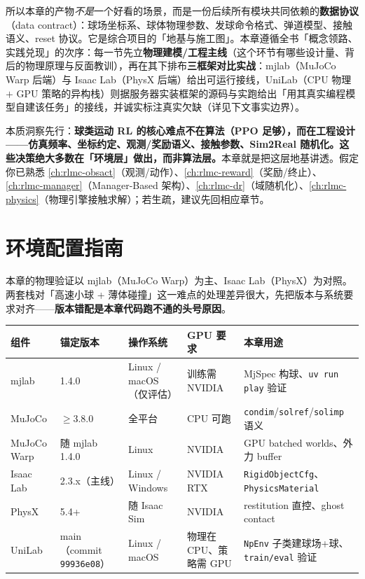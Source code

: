 所以本章的产物\emph{不是}一个好看的场景，而是一份后续所有模块共同依赖的\textbf{数据协议}（data contract）：球场坐标系、球体物理参数、发球命令格式、弹道模型、接触语义、reset 协议。它是综合项目的「地基与施工图」。本章遵循全书「概念领路、实践兑现」的次序：每一节先立\textbf{物理建模/工程主线}（这个环节有哪些设计量、背后的物理原理与反面教训），再在其下排布\textbf{三框架对比实战}：mjlab（MuJoCo Warp 后端）与 Isaac Lab（PhysX 后端）给出可运行接线，UniLab（CPU 物理 $+$ GPU 策略的异构栈）则据服务器实装框架的源码与实跑给出「用其真实编程模型自建该任务」的接线，并诚实标注真实欠缺（详见下文事实边界）。

本质洞察先行：\textbf{球类运动 RL 的核心难点不在算法（PPO 足够），而在工程设计——仿真频率、坐标约定、观测/奖励语义、接触参数、Sim2Real 随机化。这些决策绝大多数在「环境层」做出，而非算法层。}本章就是把这层地基讲透。假定你已熟悉 \cref{ch:rlmc-obsact}（观测/动作）、\cref{ch:rlmc-reward}（奖励/终止）、\cref{ch:rlmc-manager}（Manager-Based 架构）、\cref{ch:rlmc-dr}（域随机化）、\cref{ch:rlmc-physics}（物理引擎接触求解）；若生疏，建议先回相应章节。

\section*{环境配置指南}
\label{sec:rlmc-tennis-env}

本章的物理验证以 mjlab（MuJoCo Warp）为主、Isaac Lab（PhysX）为对照。两套栈对「高速小球 + 薄体碰撞」这一难点的处理差异很大，先把版本与系统要求对齐——\textbf{版本错配是本章代码跑不通的头号原因}。

\begin{center}
\small
\begin{tabular}{@{}lllll@{}}
\toprule
组件 & 锚定版本 & 操作系统 & GPU 要求 & 本章用途 \\
\midrule
mjlab & 1.4.0 & Linux / macOS（仅评估） & 训练需 NVIDIA & MjSpec 构球、\verb|uv run play| 验证 \\
MuJoCo & $\ge 3.8.0$ & 全平台 & CPU 可跑 & \verb|condim|/\verb|solref|/\verb|solimp| 语义 \\
MuJoCo Warp & 随 mjlab 1.4.0 & Linux & NVIDIA & GPU batched worlds、外力 buffer \\
Isaac Lab & 2.3.x（主线） & Linux / Windows & NVIDIA RTX & \verb|RigidObjectCfg|、\verb|PhysicsMaterial| \\
PhysX & 5.4+ & 随 Isaac Sim & NVIDIA & restitution 直控、ghost contact \\
UniLab & main（commit \texttt{99936e08}） & Linux / macOS & 物理在 CPU、策略需 GPU & \verb|NpEnv| 子类建球场+球、\verb|train/eval| 验证 \\
\bottomrule
\end{tabular}
\end{center}

